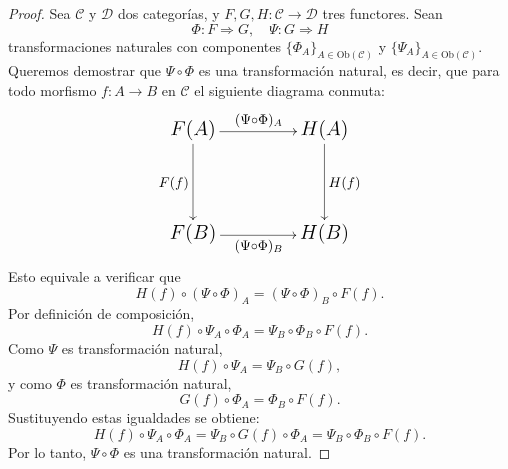 \begin{definicion}
\end{definicion}

\begin{proposicion}\label{lkjhgf}
\end{proposicion}

\begin{proof}
	Sea \(\mathcal{C}\) y \(\mathcal{D}\) dos categorías, y \(F, G, H : \mathcal{C} \to \mathcal{D}\) tres functores. Sean 
	\[
	\Phi : F \Longrightarrow G, \quad \Psi : G \Longrightarrow H
	\]
	transformaciones naturales con componentes \(\{\Phi_A\}_{A \in \mathrm{Ob}(\mathcal{C})}\) y \(\{\Psi_A\}_{A \in \mathrm{Ob}(\mathcal{C})}\).\\
	
	
	\noindent Queremos demostrar que \(\Psi \circ \Phi\) es una transformación natural, es decir, que para todo morfismo \(f : A \to B\) en \(\mathcal{C}\) el siguiente diagrama conmuta:
	\[
	{\Large
		\xymatrix{
			F(A) \ar[rr]^{(\Psi \circ \Phi)_A} \ar[dd]_{F(f)} && H(A) \ar[dd]^{H(f)} \\ \\
			F(B) \ar[rr]_{(\Psi \circ \Phi)_B} && H(B)
		}
	}
	\] Esto equivale a verificar que
	\[
	H(f) \circ (\Psi \circ \Phi)_A = (\Psi \circ \Phi)_B \circ F(f).
	\]	Por definición de composición,
	\[
	H(f) \circ \Psi_A \circ \Phi_A = \Psi_B \circ \Phi_B \circ F(f).
	\] Como \(\Psi\) es transformación natural,
	\[
	H(f) \circ \Psi_A = \Psi_B \circ G(f),
	\]
	y como \(\Phi\) es transformación natural,
	\[
	G(f) \circ \Phi_A = \Phi_B \circ F(f).
	\] Sustituyendo estas igualdades se obtiene:
	\[
	H(f) \circ \Psi_A \circ \Phi_A = \Psi_B \circ G(f) \circ \Phi_A = \Psi_B \circ \Phi_B \circ F(f).
	\] Por lo tanto, \(\Psi \circ \Phi\) es una transformación natural.
\end{proof}




